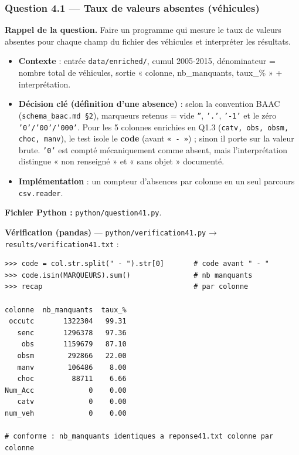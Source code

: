 \documentclass[11pt,a4paper]{article}
\newcommand{\rub}[2]{\textbf{\textcolor{#1}{#2}}}
\begin{document}
\clearpage
\subsubsection*{Question 4.1 — Taux de valeurs absentes (véhicules)}

\rub{labrappel}{Rappel de la question.} Faire un programme qui mesure le taux de valeurs absentes pour chaque champ du fichier des véhicules et interpréter les résultats.

\begin{agentbox}
\begin{itemize}
\item \textbf{Contexte} : entrée \texttt{data/enriched/}, cumul 2005-2015, dénominateur = nombre total de véhicules, sortie « colonne, nb\_manquants, taux\_\% » + interprétation.
\item \textbf{Décision clé (définition d'une absence)} : selon la convention BAAC (\texttt{schema\_baac.md §2}), marqueurs retenus = vide \texttt{''}, \texttt{'.'}, \texttt{'-1'} et le zéro \texttt{'0'/'00'/'000'}. Pour les 5 colonnes enrichies en Q1.3 (\texttt{catv, obs, obsm, choc, manv}), le test isole le \textbf{code} (avant \texttt{« - »}) ; sinon il porte sur la valeur brute. \texttt{'0'} est compté mécaniquement comme absent, mais l'interprétation distingue « non renseigné » et « sans objet » documenté.
\item \textbf{Implémentation} : un compteur d'absences par colonne en un seul parcours \texttt{csv.reader}.
\end{itemize}
\end{agentbox}

\rub{labfichier}{Fichier Python :} \texttt{python/question41.py}.

\rub{labverif}{Vérification (pandas)} --- \texttt{python/verification41.py} → \texttt{results/verification41.txt} :

\begin{lstlisting}[style=pyblock]
>>> code = col.str.split(" - ").str[0]       # code avant " - "
>>> code.isin(MARQUEURS).sum()               # nb manquants
>>> recap                                    # par colonne

colonne  nb_manquants  taux_%
 occutc       1322304   99.31
   senc       1296378   97.36
    obs       1159679   87.10
   obsm        292866   22.00
   manv        106486    8.00
   choc         88711    6.66
Num_Acc             0    0.00
   catv             0    0.00
num_veh             0    0.00

# conforme : nb_manquants identiques a reponse41.txt colonne par colonne
\end{lstlisting}
\end{document}
